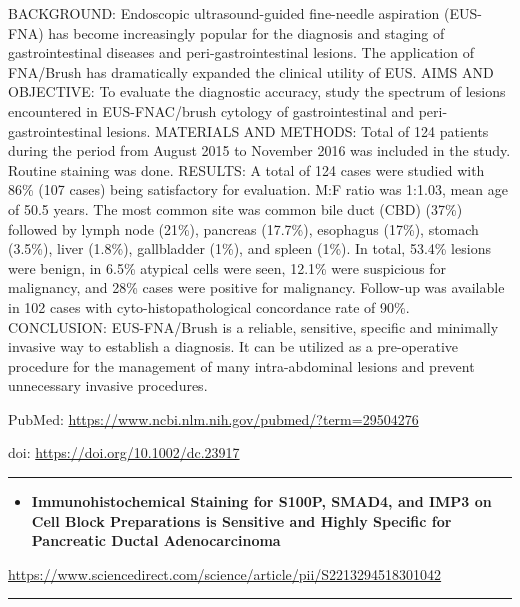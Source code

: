 \documentclass[]{article}
\providecommand{\tightlist}{%
  \setlength{\itemsep}{0pt}\setlength{\parskip}{0pt}}
\begin{document}
BACKGROUND: Endoscopic ultrasound-guided fine-needle aspiration
(EUS-FNA) has become increasingly popular for the diagnosis and staging
of gastrointestinal diseases and peri-gastrointestinal lesions. The
application of FNA/Brush has dramatically expanded the clinical utility
of EUS. AIMS AND OBJECTIVE: To evaluate the diagnostic accuracy, study
the spectrum of lesions encountered in EUS-FNAC/brush cytology of
gastrointestinal and peri-gastrointestinal lesions. MATERIALS AND
METHODS: Total of 124 patients during the period from August 2015 to
November 2016 was included in the study. Routine staining was done.
RESULTS: A total of 124 cases were studied with 86\% (107 cases) being
satisfactory for evaluation. M:F ratio was 1:1.03, mean age of 50.5
years. The most common site was common bile duct (CBD) (37\%) followed
by lymph node (21\%), pancreas (17.7\%), esophagus (17\%), stomach
(3.5\%), liver (1.8\%), gallbladder (1\%), and spleen (1\%). In total,
53.4\% lesions were benign, in 6.5\% atypical cells were seen, 12.1\%
were suspicious for malignancy, and 28\% cases were positive for
malignancy. Follow-up was available in 102 cases with
cyto-histopathological concordance rate of 90\%. CONCLUSION:
EUS-FNA/Brush is a reliable, sensitive, specific and minimally invasive
way to establish a diagnosis. It can be utilized as a pre-operative
procedure for the management of many intra-abdominal lesions and prevent
unnecessary invasive procedures.

PubMed: \url{https://www.ncbi.nlm.nih.gov/pubmed/?term=29504276}

doi: \url{https://doi.org/10.1002/dc.23917}

{}

{}

\begin{center}\rule{0.5\linewidth}{\linethickness}\end{center}

\begin{itemize}
\tightlist
\item
  \textbf{Immunohistochemical Staining for S100P, SMAD4, and IMP3 on
  Cell Block Preparations is Sensitive and Highly Specific for
  Pancreatic Ductal Adenocarcinoma}
\end{itemize}

\url{https://www.sciencedirect.com/science/article/pii/S2213294518301042}

\begin{center}\rule{0.5\linewidth}{\linethickness}\end{center}
\end{document}

